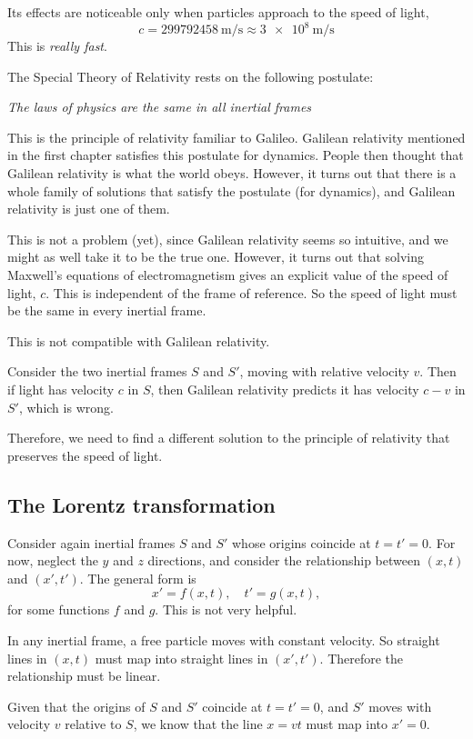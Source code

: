 \documentclass[a4paper]{article}
\begin{document}
Its effects are noticeable only when particles approach to the speed of light,
\[
  c = \SI{299792458}{\meter\per\second} \approx \SI{3e8}{\meter\per\second}
\]
This is \emph{really fast}.

The Special Theory of Relativity rests on the following postulate:
\begin{center}
  \emph{The laws of physics are the same in all inertial frames}
\end{center}
This is the principle of relativity familiar to Galileo. Galilean relativity mentioned in the first chapter satisfies this postulate for dynamics. People then thought that Galilean relativity is what the world obeys. However, it turns out that there is a whole family of solutions that satisfy the postulate (for dynamics), and Galilean relativity is just one of them.

This is not a problem (yet), since Galilean relativity seems so intuitive, and we might as well take it to be the true one. However, it turns out that solving Maxwell's equations of electromagnetism gives an explicit value of the speed of light, $c$. This is independent of the frame of reference. So the speed of light must be the same in every inertial frame.

This is not compatible with Galilean relativity.

Consider the two inertial frames $S$ and $S'$, moving with relative velocity $v$. Then if light has velocity $c$ in $S$, then Galilean relativity predicts it has velocity $c - v$ in $S'$, which is wrong.

Therefore, we need to find a different solution to the principle of relativity that preserves the speed of light.

\subsection{The Lorentz transformation}
Consider again inertial frames $S$ and $S'$ whose origins coincide at $t = t' = 0$. For now, neglect the $y$ and $z$ directions, and consider the relationship between $(x, t)$ and $(x', t')$. The general form is
\[
  x' = f(x, t),\quad t' = g(x, t),
\]
for some functions $f$ and $g$. This is not very helpful.

In any inertial frame, a free particle moves with constant velocity. So straight lines in $(x, t)$ must map into straight lines in $(x', t')$. Therefore the relationship must be linear.

Given that the origins of $S$ and $S'$ coincide at $t = t' = 0$, and $S'$ moves with velocity $v$ relative to $S$, we know that the line $x = vt$ must map into $x'= 0$.
\end{document}
